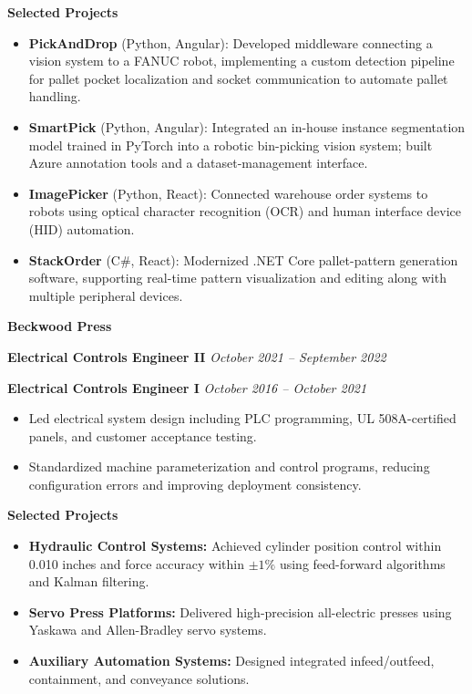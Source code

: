 \documentclass[letterpaper,10pt]{article}
\newcommand{\role}[2]{%
  \noindent\textbf{#1} \hfill \textit{#2}\par
}
\begin{document}
\textbf{Selected Projects}
\begin{itemize}[left=1em, itemsep=0.15em, topsep=3pt, parsep=0pt]
    \item \textbf{PickAndDrop} (Python, Angular): Developed middleware connecting a vision system to a FANUC robot, implementing a custom detection pipeline for pallet pocket localization and socket communication to automate pallet handling.
    \item \textbf{SmartPick} (Python, Angular): Integrated an in-house instance segmentation model trained in PyTorch into a robotic bin-picking vision system; built Azure annotation tools and a dataset-management interface.
    \item \textbf{ImagePicker} (Python, React): Connected warehouse order systems to robots using optical character recognition (OCR) and human interface device (HID) automation.
    \item \textbf{StackOrder} (C\#, React): Modernized .NET Core pallet-pattern generation software, supporting real-time pattern visualization and editing along with multiple peripheral devices.
\end{itemize}
\medskip

\noindent\textbf{Beckwood Press}\par
\role{Electrical Controls Engineer II}{October 2021 -- September 2022}
\role{Electrical Controls Engineer I}{October 2016 -- October 2021}
\begin{itemize}[left=1em, itemsep=0.15em, topsep=3pt, parsep=0pt]
    \item Led electrical system design including PLC programming, UL 508A-certified panels, and customer acceptance testing.
    \item Standardized machine parameterization and control programs, reducing configuration errors and improving deployment consistency.
\end{itemize}

\textbf{Selected Projects}
\begin{itemize}[left=1em, itemsep=0.15em, topsep=3pt, parsep=0pt]
    \item \textbf{Hydraulic Control Systems:} Achieved cylinder position control within 0.010 inches and force accuracy within $\pm 1\%$ using feed-forward algorithms and Kalman filtering.
    \item \textbf{Servo Press Platforms:} Delivered high-precision all-electric presses using Yaskawa and Allen-Bradley servo systems.
    \item \textbf{Auxiliary Automation Systems:} Designed integrated infeed/outfeed, containment, and conveyance solutions.
\end{itemize}
\medskip
\end{document}
